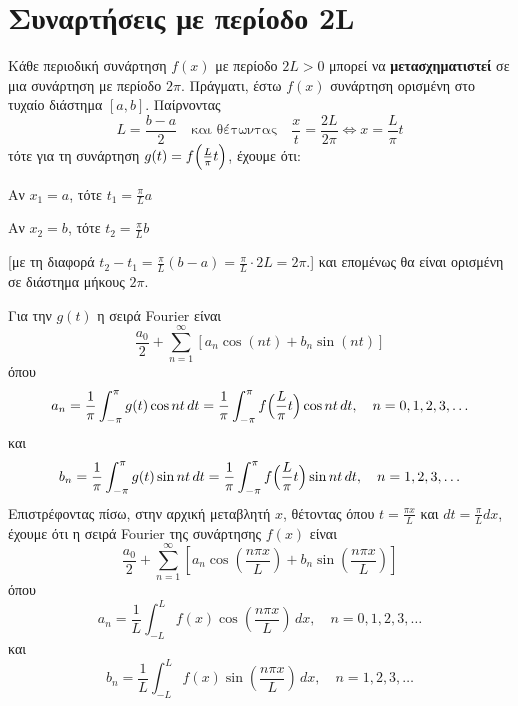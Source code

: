      \section{Συναρτήσεις με περίοδο 2L}

     \begin{rem}
       Κάθε περιοδική συνάρτηση $ f(x) $ με περίοδο $ 2L>0 $ μπορεί να 
       \textbf{μετασχηματιστεί} σε μια συνάρτηση με περίοδο $ 2 \pi $. Πράγματι, έστω 
       $ f(x) $ συνάρτηση ορισμένη στο τυχαίο διάστημα $ [a,b] $. Παίρνοντας 
       \[ 
         L = \frac{b-a}{2} \quad \text{και θέτωντας} \quad 
         \frac{x}{t} = \frac{2L}{2 \pi} \Leftrightarrow \boxed{x= \frac{L}{\pi} t}
       \]
       τότε για τη συνάρτηση $ g(t) = f\Bigl(\frac{L}{\pi}t\Bigr) $, έχουμε ότι:
       \begin{myitemize}
         \item Αν $ x_{1}= a $, τότε $ t_{1} = \frac{\pi}{L} a $ 
         \item Αν $ x_{2}= b $, τότε $ t_{2} = \frac{\pi}{L} b $ 
       \end{myitemize}
       [με τη διαφορά $ t_{2}- t_{1} = \frac{\pi}{L} (b-a) = \frac{\pi}{L} 
       \cdot 2L = 2 \pi $.] 
       και επομένως θα είναι ορισμένη σε διάστημα μήκους $ 2 \pi $.

     \end{rem}
     Για την $ g(t) $ η σειρά Fourier είναι 
     \[
       \frac{a_{0}}{2} + \sum_{n=1}^{\infty} [a_{n} \cos{(nt)} + b_{n} \sin{(nt)}]
     \] 
     όπου 
     \[
       a_{n} = \frac{1}{\pi} \int _{- \pi}^{\pi} g(t) \cos{nt} \,{dt} = 
       \frac{1}{\pi} \int _{- \pi}^{\pi} f\Bigl(\frac{L}{\pi} t\Bigr) \cos{nt} \,{dt}, 
       \quad n = 0,1,2,3, \ldots
     \] 
     και 
     \[
       b_{n} = \frac{1}{\pi} \int _{- \pi}^{\pi} g(t) \sin{nt} \,{dt} = 
       \frac{1}{\pi} \int _{- \pi}^{\pi} f\Bigl(\frac{L}{\pi} t\Bigr) \sin{nt} \,{dt}, 
       \quad n = 1,2,3, \ldots
     \]
     Επιστρέφοντας πίσω, στην αρχική μεταβλητή $x$, θέτοντας όπου $ t = \frac{\pi x}{L} $ 
     και $ dt = \frac{\pi}{L} dx $, έχουμε ότι η σειρά Fourier της συνάρτησης $ f(x) $ είναι
     \[
       \boxed{\frac{a_{0}}{2} + \sum_{n=1}^{\infty} \left[a_{n} \cos{\left(\frac{n \pi x}{L}\right)} 
       + b_{n} \sin{\left(\frac{n \pi x}{L}\right)} \right]}
     \]
     όπου 
     \[
       a_{n} = \frac{1}{L} \int _{- L}^{L} f(x) 
       \cos{\left(\frac{n \pi x}{L}\right)} \,{dx}, \quad n = 0,1,2,3, \ldots
     \] 
     και 
     \[
       b_{n} = \frac{1}{L} \int _{- L}^{L} f(x) 
       \sin{\left(\frac{n \pi x}{L}\right)} \,{dx}, \quad n = 1,2,3, \ldots
     \]

